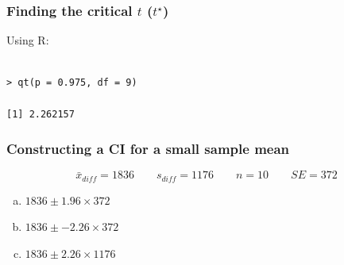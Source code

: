 
\begin{frame}[fragile]
\frametitle{Finding the critical $t$ ($t^\star$)}


Using R:
\begin{verbatim}

> qt(p = 0.975, df = 9)

[1] 2.262157

\end{verbatim}

\end{frame}


\begin{frame}
\frametitle{Constructing a CI for a small sample mean}

\[ \bar{x}_{diff} = 1836 \qquad s_{diff} = 1176 \qquad n = 10 \qquad SE = 372 \]

{
\begin{enumerate}[(a)]

\item $1836 \pm 1.96 \times 372$


\item $1836 \pm -2.26 \times 372$

\item $1836 \pm 2.26 \times 1176$

\end{enumerate}
}
{
\vspace{0.25cm}
}

\end{frame}


